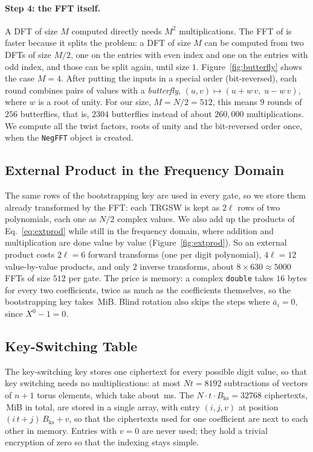 \documentclass[12pt]{article}
\theoremstyle{plain}
\theoremstyle{definition}
\newcommand{\Bks}{B_{\mathrm{ks}}}
\newcommand{\code}[1]{\texttt{#1}}
\begin{document}
\paragraph{Step 4: the FFT itself.}
A DFT of size $M$ computed directly needs $M^2$ multiplications. The FFT of
\cite{cooley1965fft} is faster because it splits the problem: a DFT of size $M$
can be computed from two DFTs of size $M/2$, one on the entries with even index
and one on the entries with odd index, and those can be split again, until
size $1$. Figure~\ref{fig:butterfly} shows the case $M=4$. After putting the
inputs in a special order (bit-reversed), each round combines pairs of values
with a \emph{butterfly}, $(u,v)\mapsto(u+w\,v,\;u-w\,v)$, where $w$ is a root of
unity. For our size, $M=N/2=512$, this means $9$ rounds of $256$ butterflies,
that is, $2304$ butterflies instead of about $260{,}000$ multiplications. We
compute all the twist factors, roots of unity and the bit-reversed order once,
when the \code{NegFFT} object is created.



\subsection{External Product in the Frequency Domain}

The same rows of the bootstrapping key are used in every gate, so we store
them already transformed by the FFT: each TRGSW is kept as $2\ell$ rows of two
polynomials, each one as $N/2$ complex values. We also add up the products of
Eq.~\eqref{eq:extprod} while still in the frequency domain, where addition and
multiplication are done value by value (Figure~\ref{fig:extprod}). So an
external product costs $2\ell=6$ forward transforms (one per digit polynomial),
$4\ell=12$ value-by-value products, and only $2$ inverse transforms, about
$8\times630\approx5000$ FFTs of size $512$ per gate. The price is memory: a
complex \code{double} takes $16$ bytes for every two coefficients, twice as
much as the coefficients themselves, so the bootstrapping key takes
\BkMB\,MiB. Blind rotation also skips the steps where $\bar a_i=0$, since
$X^0-1=0$.



\subsection{Key-Switching Table}

The key-switching key stores one ciphertext for every possible digit value, so
that key switching needs no multiplications: at most $Nt=8192$ subtractions of
vectors of $n+1$ torus elements, which take about \OurKS\,ms. The
$N\cdot t\cdot\Bks=32768$ ciphertexts, \KskMB\,MiB in total, are stored in a
single array, with entry $(i,j,v)$ at position $(i\,t+j)\,\Bks+v$, so that the
ciphertexts used for one coefficient are next to each other in memory. Entries
with $v=0$ are never used; they hold a trivial encryption of zero so that the
indexing stays simple.
\end{document}

